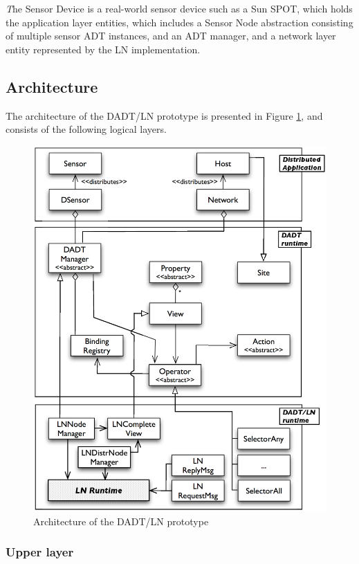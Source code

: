 \emph The {Sensor Device} is a real-world sensor device such as a Sun SPOT, 
which holds the application layer entities, which includes a Sensor Node
abstraction consisting of multiple sensor ADT instances, and an ADT
manager, and a network layer entity represented by the LN implementation.

\subsection{Architecture}

The architecture of the DADT/LN prototype is presented in Figure
\ref{Fig:DADTLN_architecture}, and consists of the following logical layers.

\begin{figure}
\centering
\includegraphics[scale=0.65]{img/DADTLN_architecture.eps} 
\caption[DADT/LN architecture]{Architecture of the DADT/LN prototype}
\label{Fig:DADTLN_architecture}
\end{figure} 

\subsubsection{Upper layer}

